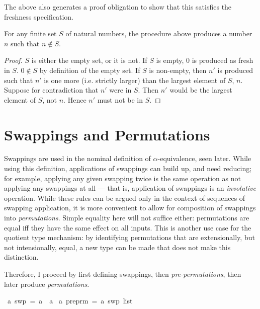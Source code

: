 The above also generates a proof obligation to show that this satisfies the freshness specification.

\begin{lemma}
For any finite set \(S\) of natural numbers, the procedure above produces a number \(n\) such that \(n \notin S\).
\end{lemma}
\begin{proof}
\(S\) is either the empty set, or it is not.
If \(S\) is empty, 0 is produced as fresh in \(S\).
\(0 \notin S\) by definition of the empty set.
If \(S\) is non-empty, then \(n'\) is produced such that \(n'\) is one more (i.e. strictly larger) than the largest element of \(S\), \(n\).
Suppose for contradiction that \(n'\) were in \(S\).
Then \(n'\) would be the largest element of \(S\), not \(n\).
Hence \(n'\) must not be in \(S\).
\end{proof}

\section{Swappings and Permutations}
Swappings are used in the nominal definition of \(\alpha\)-equivalence, seen later.
While using this definition, applications of swappings can build up, and need reducing; for example, applying any given swapping twice is the same operation as not applying any swappings at all --- that is, application of swappings is an \emph{involutive} operation.
While these rules can be argued only in the context of sequences of swapping application, it is more convenient to allow for composition of swappings into \emph{permutations}.
Simple equality here will not suffice either: permutations are equal iff they have the same effect on all inputs.
This is another use case for the quotient type mechanism: by identifying permutations that are extensionally, but not intensionally, equal, a new type can be made that does not make this distinction.

Therefore, I proceed by first defining swappings, then \emph{pre-permutations}, then later produce \emph{permutations}.

\begin{implementation}
\isamarkupfalse%
\ {\isacharprime}a\ swp\ =\ {\isachardoublequoteopen}{\isacharprime}a\ {\isasymtimes}\ {\isacharprime}a{\isachardoublequoteclose}\isanewline
{}\isamarkupfalse%
\ {\isacharprime}a\ preprm\ =\ {\isachardoublequoteopen}{\isacharprime}a\ swp\ list{\isachardoublequoteclose}\isanewline
\end{implementation}

